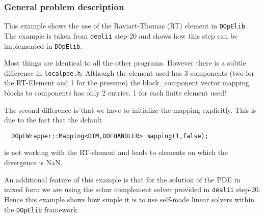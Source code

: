 \subsubsection{General problem description}
This example shows the use of the Raviart-Thomas (RT) element in \texttt{DOpElib}. The example 
is taken from \texttt{dealii} step-20 and shows how this step can be implemented in \texttt{DOpElib}.

Most things are identical to all the other programs. However there is a subtle difference in 
\texttt{localpde.h}: Although the element used has 3 components (two for the RT-Element and 1 for the pressure)
the block_component vector mapping blocks to components has only 2 entries. 1 for each finite element used!

The second difference is that we have to initialize the mapping explicitly. This is due to the fact that the 
default 
\begin{verbatim}
  DOpEWrapper::Mapping<DIM,DOFHANDLER> mapping(1,false);
\end{verbatim}
is not working with the RT-element and leads to elements on which the divergence is NaN.

An additional feature of this example is that for the solution of the PDE in mixed form we are using the 
schur complement solver provided in \texttt{dealii} step-20. Hence this example shows how simple it is to 
use self-made linear solvers within the \texttt{DOpElib} framework.